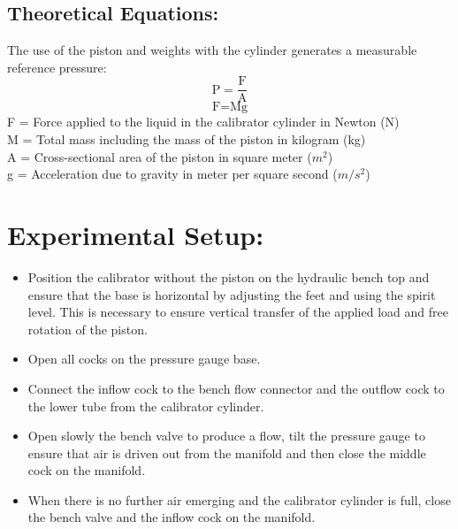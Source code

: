 \documentclass[12pt,a4paper]{article}
\begin{document}
\subsection{Theoretical Equations:}
The use of the piston and weights with the cylinder generates a measurable reference pressure: 
\begin{equation}
\text{P} = \frac{\text{F}}{\text{A}}
\end{equation}
\begin{equation}
\text{F} = \text{M} \text{g}
\end{equation}
F = Force applied to the liquid in the calibrator cylinder in Newton (N)\\
M = Total mass including the mass of the piston in kilogram (kg)\\
A = Cross-sectional area of the piston in square meter ($m^2$)\\
g = Acceleration due to gravity in meter per square second ($m/s^2$)\\
\section{Experimental Setup:}
\begin{itemize}
\item Position the calibrator without the piston on the hydraulic bench top and ensure that the base is horizontal by adjusting the feet and using the spirit level. This is necessary to ensure vertical transfer of the applied load and free rotation of the piston. 
\item Open all cocks on the pressure gauge base. 
\item Connect the inflow cock to the bench flow connector and the outflow cock to the lower tube from the calibrator cylinder.
\item Open slowly the bench valve to produce a flow, tilt the pressure gauge to ensure that air is driven out from the manifold and then close the middle cock on the manifold. 
\item When there is no further air emerging and the calibrator cylinder is full, close the bench valve and the inflow cock on the manifold. 
\end{itemize}
\end{document}
